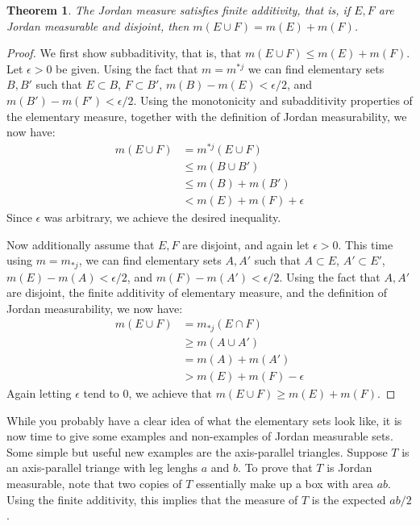 \documentclass[11pt,oneside]{amsbook}
\theoremstyle{definition}
\theoremstyle{plain}
\newtheorem{thm}{Theorem}[section]
\theoremstyle{definition}
\theoremstyle{remark}
\numberwithin{equation}{section}
\numberwithin{figure}{section}
\begin{document}
\begin{thm}
  The Jordan measure satisfies finite additivity, that is, if $E,F$ are Jordan measurable and disjoint, then $m(E\cup F)=m(E)+m(F)$.
\end{thm}

\begin{proof}
  We first show subbaditivity, that is, that $m(E\cup F)\leq m(E)+m(F)$. Let $\epsilon>0$ be given. Using the fact that $m=m^{*j}$ we can find elementary sets $B,B'$ such that $E\subset B$, $F\subset B'$, $m(B)-m(E)<\epsilon/2$, and $m(B')-m(F')<\epsilon/2$. Using the monotonicity and subadditivity properties of the elementary measure, together with the definition of Jordan measurability, we now have:
  \begin{align*}
    m(E\cup F)&=m^{*j}(E\cup F)\\
              &\leq m(B\cup B')\\
              &\leq m(B)+m(B')\\
              &< m(E)+m(F)+\epsilon
  \end{align*}
  Since $\epsilon$ was arbitrary, we achieve the desired inequality.
  
  Now additionally assume that $E,F$ are disjoint, and again let $\epsilon>0$. This time using $m=m_{*j}$, we can find elementary sets $A,A'$ such that $A\subset E$, $A'\subset E'$, $m(E)-m(A)<\epsilon/2$, and $m(F)-m(A')<\epsilon/2$. Using the fact that $A,A'$ are disjoint, the finite additivity of elementary measure, and the definition of Jordan measurability, we now have:
  \begin{align*}
    m(E\cup F)&=m_{*j}(E\cap F)\\
              &\geq m(A\cup A')\\
              &=m(A)+m(A')\\
              &>m(E)+m(F)-\epsilon
  \end{align*}
  Again letting $\epsilon$ tend to $0$, we achieve that $m(E\cup F)\geq m(E)+m(F)$.
\end{proof}

While you probably have a clear idea of what the elementary sets look like, it is now time to give some examples and non-examples of Jordan measurable sets. Some simple but useful new examples are the axis-parallel triangles. Suppose $T$ is an axis-parallel triange with leg lenghs $a$ and $b$. To prove that $T$ is Jordan measurable, note that two copies of $T$ essentially make up a box with area $ab$. Using the finite additivity, this implies that the measure of $T$ is the expected $ab/2$.
\end{document}
